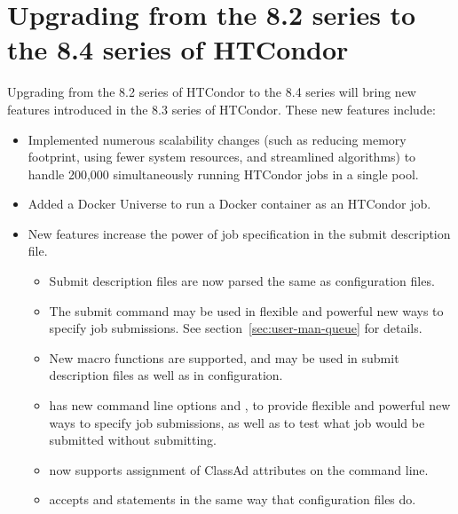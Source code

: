 \section{\label{sec:to-8.4}Upgrading from the 8.2 series to the 8.4 series of HTCondor}

Upgrading from the 8.2 series of HTCondor to the 8.4 series
will bring new features introduced in the 8.3 series of HTCondor.
These new features include:
\begin{itemize}

\item Implemented numerous scalability changes (such as reducing memory
footprint, using fewer system resources, and streamlined algorithms) to
handle 200,000 simultaneously running HTCondor jobs in a single pool.

\item Added a Docker Universe to run a Docker container as an HTCondor job.

\item New features increase the power of job specification
in the submit description file.

  \begin{itemize}
  \item Submit description files are now parsed the same as configuration files.

  \item The  submit command may be used in
flexible and powerful new ways to specify job submissions.
See section~\ref{sec:user-man-queue} for details.

  \item New macro functions are supported,
and may be used in submit description files as well as in configuration.

  \item {} has new command line options 
and ,
to provide flexible and powerful new ways to specify job submissions,
as well as to test what job would be submitted without submitting.

  \item {} now supports assignment of ClassAd attributes
on the command line.

  \item {} accepts  and 
statements in the same way that configuration files do.


\end{itemize}
\end{itemize}
